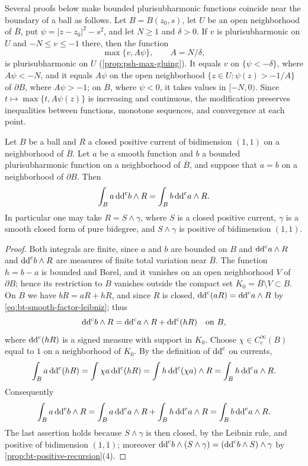 Several proofs below make bounded plurisubharmonic functions coincide near the boundary of a ball as follows. Let $B=B(z_0,s)$, let $U$ be an open neighborhood of $\overline B$, put $\psi=|z-z_0|^2-s^2$, and let $N\ge1$ and $\delta>0$. If $v$ is plurisubharmonic on $U$ and $-N\le v\le-1$ there, then the function
\begin{equation}\label{eq:bt-boundary-modification}
 \max\{v,A\psi\},\qquad A=N/\delta,
\end{equation}
is plurisubharmonic on $U$ (\cref{prop:psh-max-gluing}). It equals $v$ on $\{\psi<-\delta\}$, where $A\psi<-N$, and it equals $A\psi$ on the open neighborhood $\{z\in U:\psi(z)>-1/A\}$ of $\partial B$, where $A\psi>-1$; on $B$, where $\psi<0$, it takes values in $[-N,0)$. Since $t\mapsto\max\{t,A\psi(z)\}$ is increasing and continuous, the modification preserves inequalities between functions, monotone sequences, and convergence at each point.

\begin{lemma}\label{lem:bt-common-boundary-values}
Let $B$ be a ball and $R$ a closed positive current of bidimension $(1,1)$ on a neighborhood of $\overline B$. Let $a$ be a smooth function and $b$ a bounded plurisubharmonic function on a neighborhood of $\overline B$, and suppose that $a=b$ on a neighborhood of $\partial B$. Then
\[
 \int_B a\,\mathrm{dd}^{\mathrm{c}} b\wedge R=\int_B b\,\mathrm{dd}^{\mathrm{c}} a\wedge R.
\]
In particular one may take $R=S\wedge\gamma$, where $S$ is a closed positive current, $\gamma$ is a smooth closed form of pure bidegree, and $S\wedge\gamma$ is positive of bidimension $(1,1)$.
\end{lemma}
\begin{proof}
Both integrals are finite, since $a$ and $b$ are bounded on $B$ and $\mathrm{dd}^{\mathrm{c}} a\wedge R$ and $\mathrm{dd}^{\mathrm{c}} b\wedge R$ are measures of finite total variation near $\overline B$. The function $h=b-a$ is bounded and Borel, and it vanishes on an open neighborhood $V$ of $\partial B$; hence its restriction to $B$ vanishes outside the compact set $K_0=\overline B\setminus V\subset B$. On $B$ we have $bR=aR+hR$, and since $R$ is closed, $\mathrm{dd}^{\mathrm{c}}(aR)=\mathrm{dd}^{\mathrm{c}} a\wedge R$ by \eqref{eq:bt-smooth-factor-leibniz}; thus
\[
 \mathrm{dd}^{\mathrm{c}} b\wedge R=\mathrm{dd}^{\mathrm{c}} a\wedge R+\mathrm{dd}^{\mathrm{c}}(hR)\quad\text{on }B,
\]
where $\mathrm{dd}^{\mathrm{c}}(hR)$ is a signed measure with support in $K_0$. Choose $\chi\in C^\infty_c(B)$ equal to $1$ on a neighborhood of $K_0$. By the definition of $\mathrm{dd}^{\mathrm{c}}$ on currents,
\[
 \int_Ba\,\mathrm{dd}^{\mathrm{c}}(hR)=\int\chi a\,\mathrm{dd}^{\mathrm{c}}(hR)=\int h\,\mathrm{dd}^{\mathrm{c}}(\chi a)\wedge R=\int_Bh\,\mathrm{dd}^{\mathrm{c}} a\wedge R.
\]
Consequently
\[
 \int_Ba\,\mathrm{dd}^{\mathrm{c}} b\wedge R=\int_Ba\,\mathrm{dd}^{\mathrm{c}} a\wedge R+\int_Bh\,\mathrm{dd}^{\mathrm{c}} a\wedge R=\int_Bb\,\mathrm{dd}^{\mathrm{c}} a\wedge R.
\]
The last assertion holds because $S\wedge\gamma$ is then closed, by the Leibniz rule, and positive of bidimension $(1,1)$; moreover $\mathrm{dd}^{\mathrm{c}} b\wedge(S\wedge\gamma)=(\mathrm{dd}^{\mathrm{c}} b\wedge S)\wedge\gamma$ by \cref{prop:bt-positive-recursion}(4).
\end{proof}

